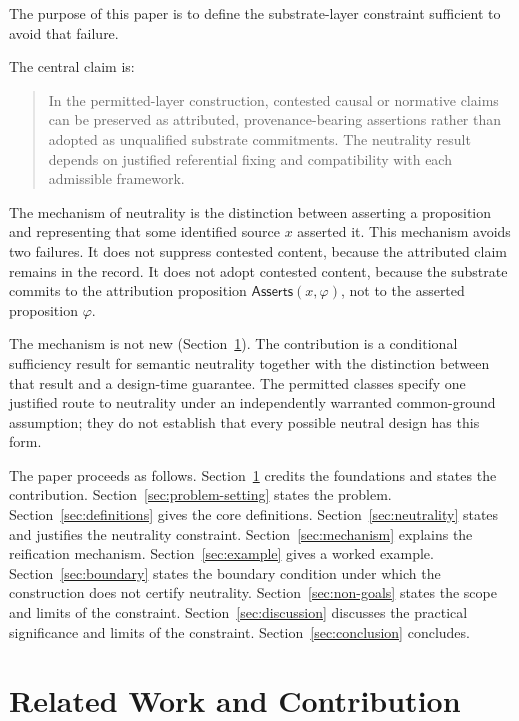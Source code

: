 \documentclass[11pt]{article}
\theoremstyle{plain}
\theoremstyle{definition}
\theoremstyle{remark}
\newcommand{\SecRef}[1]{Section~\ref{#1}}
\newcommand{\Asserts}{\mathsf{Asserts}}
\begin{document}
The purpose of this paper is to define the substrate-layer constraint
sufficient to avoid that failure.

The central claim is:

\begin{quote}
  In the permitted-layer construction, contested causal or normative
  claims can be preserved as attributed, provenance-bearing assertions
  rather than adopted as unqualified substrate commitments.
  The neutrality result depends on justified referential fixing
  and compatibility with each admissible framework.
\end{quote}

The mechanism of neutrality is the distinction between
asserting a proposition and representing that some identified source $x$
asserted it.
This mechanism avoids two failures.
It does not suppress contested content,
because the attributed claim remains in the record.
It does not adopt contested content,
because the substrate commits to the attribution proposition
$\Asserts(x,\varphi)$,
not to the asserted proposition $\varphi$.

The mechanism is not new (\SecRef{sec:related-work}).
The contribution is a conditional sufficiency result for semantic neutrality
together with the distinction between that result and a design-time guarantee.
The permitted classes specify one justified route to neutrality
under an independently warranted common-ground assumption;
they do not establish that every possible neutral design has this form.

The paper proceeds as follows.
\SecRef{sec:related-work} credits the foundations and states the contribution.
\SecRef{sec:problem-setting} states the problem.
\SecRef{sec:definitions} gives the core definitions.
\SecRef{sec:neutrality} states and justifies the neutrality constraint.
\SecRef{sec:mechanism} explains the reification mechanism.
\SecRef{sec:example} gives a worked example.
\SecRef{sec:boundary} states the boundary condition under which the construction does not certify neutrality.
\SecRef{sec:non-goals} states the scope and limits of the constraint.
\SecRef{sec:discussion} discusses the practical significance and limits of the constraint.
\SecRef{sec:conclusion} concludes.

\section{Related Work and Contribution}
\label{sec:related-work}
\end{document}
